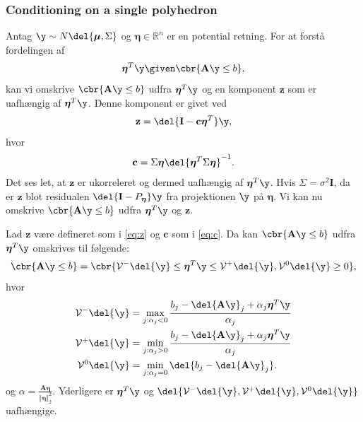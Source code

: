 \subsubsection{Conditioning on a single polyhedron}
Antag \(\y \sim N \del{\boldsymbol{\mu}, \Sigma}\) og \(\boldsymbol{\eta} \in \mathbb{R}^n\) er en potential retning.
For at forstå fordelingen af
\begin{align*}
\boldsymbol{\eta}^T \y \given \cbr{ \mathbf{A} \y \leq b},
\end{align*}
kan vi omskrive \(\cbr{\mathbf{A} \y \leq b}\) udfra \(\boldsymbol{\eta}^T \y\) og en komponent \(\mathbf{z}\) som er uafhængig af \(\boldsymbol{\eta}^T \y\). Denne komponent er givet ved
\begin{align}
\mathbf{z} = \del{\mathbf{I} - \mathbf{c} \boldsymbol{\eta}^T} \y, \label{eq:z}
\end{align}
hvor 
\begin{align}
\mathbf{c} = \Sigma \boldsymbol{\eta} \del{\boldsymbol{\eta}^T \Sigma \boldsymbol{\eta}}^{-1}. \label{eq:c}
\end{align}
Det ses let, at \(\mathbf{z}\) er ukorreleret og dermed uafhængig af \(\boldsymbol{\eta}^T \y\).
Hvis \(\Sigma = \sigma^2 \mathbf{I}\), da er \(\mathbf{z}\) blot residualen \(\del{\mathbf{I} - P_{\boldsymbol{\eta}}} \y \) fra projektionen \(\y\) på \(\boldsymbol{\eta}\).
Vi kan nu omskrive \(\cbr{\mathbf{A} \y \leq b}\) udfra \(\boldsymbol{\eta}^T \y\) og \(\mathbf{z}\).
%
\begin{lem} \label{lem:polyhedral}
Lad \(\mathbf{z}\) være defineret som i \eqref{eq:z} og \(\mathbf{c}\) som i \eqref{eq:c}. Da kan \(\cbr{\mathbf{A} \y \leq b}\) udfra \(\boldsymbol{\eta}^T \y\) omskrives til følgende:
\begin{align}
\cbr{\mathbf{A} \y \leq b} = \cbr{\mathcal{V}^- \del{\y} \leq \boldsymbol{\eta}^T \y \leq \mathcal{V}^+ \del{\y}, \mathcal{V}^0 \del{\y} \geq 0}, \label{eq:polyhedral}
\end{align}
hvor
\begin{align}
\mathcal{V}^- \del{\y} &= \max_{j: \alpha_j <0} \frac{b_j - \del{\mathbf{A} \y}_j + \alpha_j \boldsymbol{\eta}^T \y}{\alpha_j} \label{eq:V-} \\
\mathcal{V}^+ \del{\y} &= \min_{j: \alpha_j >0} \frac{b_j - \del{\mathbf{A} \y}_j + \alpha_j \boldsymbol{\eta}^T \y}{\alpha_j} \label{eq:V+} \\
\mathcal{V}^0 \del{\y} &= \min_{j: \alpha_j =0} \del{b_j - \del{\mathbf{A} \y}_j}.  \label{eq:V0} 
\end{align}
og \(\alpha=\frac{\mathbf{A} \boldsymbol{\eta}}{\Vert  \boldsymbol{\eta} \Vert_2^2}\).
Yderligere  er \(\boldsymbol{\eta}^T \y\) og \(\del{\mathcal{V}^-\del{\y}, \mathcal{V}^+\del{\y},\mathcal{V}^0\del{\y}}\) uafhængige. 
\end{lem}
